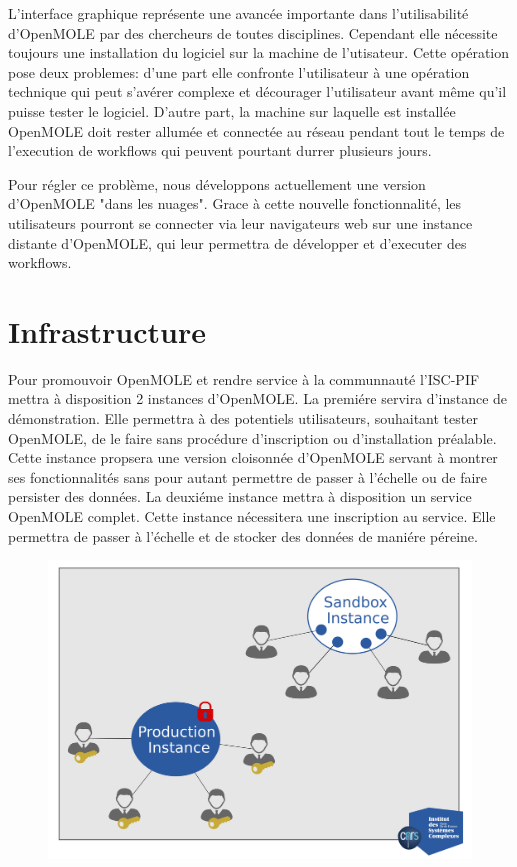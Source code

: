 \documentclass[10pt,a4paper]{article}
\begin{document}
L'interface graphique représente une avancée importante dans l'utilisabilité d'OpenMOLE par des chercheurs de toutes disciplines. Cependant elle nécessite toujours une installation du logiciel sur la machine de l'utisateur. Cette opération pose deux problemes: d'une part elle confronte l'utilisateur à une opération technique qui peut s'avérer complexe et décourager l'utilisateur avant même qu'il puisse tester le logiciel. D'autre part, la machine sur laquelle est installée OpenMOLE doit rester allumée et connectée au réseau pendant tout le temps de l'execution de workflows qui peuvent pourtant durrer plusieurs jours.

Pour régler ce problème, nous développons actuellement une version d'OpenMOLE "dans les nuages". Grace à cette nouvelle fonctionnalité, les utilisateurs pourront se connecter via leur navigateurs web sur une instance distante d'OpenMOLE, qui leur permettra de développer et d'executer des workflows.

\section{Infrastructure}

Pour promouvoir OpenMOLE et rendre service à la communnauté l'ISC-PIF mettra à disposition 2 instances d'OpenMOLE. La premiére servira d'instance de démonstration. Elle permettra à des potentiels utilisateurs, souhaitant tester OpenMOLE, de le faire sans procédure d'inscription ou d'installation préalable. Cette instance propsera une version cloisonnée d'OpenMOLE servant à montrer ses fonctionnalités sans pour autant permettre de passer à l'échelle ou de faire persister des données. La deuxiéme instance mettra à disposition un service OpenMOLE complet. Cette instance nécessitera une inscription au service. Elle permettra de passer à l'échelle et de stocker des données de maniére péreine.

\begin{figure}[h]
 \centering
  \includegraphics[width=0.8\linewidth]{img/instances.png}
\end{figure}
\end{document}
